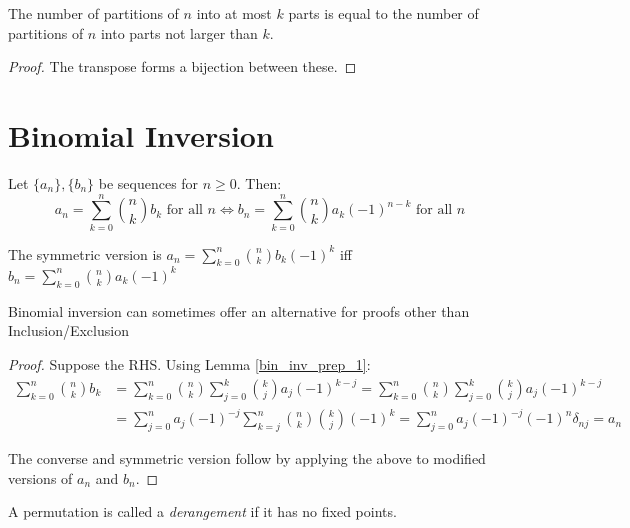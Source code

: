 \documentclass[a4paper]{article}
\begin{document}
\begin{theorem}
The number of partitions of $n$ into at most $k$ parts is equal to the number of partitions of $n$ into parts not larger than $k$.

\begin{hl}
\begin{proof}
The transpose forms a bijection between these.
\end{proof}
\end{hl}
\end{theorem}

\section{Binomial Inversion}
\begin{theorem}\label{bin_inv}
Let $\{a_n\},\{b_n\}$ be sequences for $n\geq0$. Then:
\begin{equation*}
a_n=\sum_{k=0}^n\binom nkb_k\text{ for all }n\iff b_n=\sum_{k=0}^n\binom nka_k(-1)^{n-k}\text{ for all }n
\end{equation*}
\begin{arrows}
\item The symmetric version is $\displaystyle a_n=\sum_{k=0}^n\binom nkb_k(-1)^k$ iff $\displaystyle b_n=\sum_{k=0}^n\binom nka_k(-1)^k$
\item Binomial inversion can sometimes offer an alternative for proofs other than Inclusion/Exclusion
\end{arrows}

\begin{hl}
\begin{proof}
Suppose the RHS. Using Lemma \ref{bin_inv_prep_1}:
\begin{align*}
\sum_{k=0}^n\binom nkb_k
&=\sum_{k=0}^n\binom nk\sum_{j=0}^k\binom kja_j(-1)^{k-j}
=\sum_{k=0}^n\binom nk\sum_{j=0}^k\binom kja_j(-1)^{k-j}\\
&=\sum_{j=0}^na_j(-1)^{-j}\sum_{k=j}^n\binom nk\binom kj(-1)^k
=\sum_{j=0}^na_j(-1)^{-j}(-1)^n\delta_{nj}
=a_n
\end{align*}

The converse and symmetric version follow by applying the above to modified versions of $a_n$ and $b_n$.
\end{proof}
\end{hl}
\end{theorem}

\begin{definition}
A permutation is called a \emph{derangement} if it has no fixed points.
\end{definition}
\end{document}
